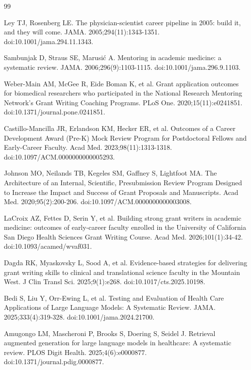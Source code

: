 \documentclass[11pt,a4paper]{article}
\begin{document}
\begin{thebibliography}{99}
\small

 Ley TJ, Rosenberg LE. The physician-scientist career pipeline in 2005: build it, and they will come. JAMA. 2005;294(11):1343-1351. doi:10.1001/jama.294.11.1343.

 Sambunjak D, Straus SE, Marusić A. Mentoring in academic medicine: a systematic review. JAMA. 2006;296(9):1103-1115. doi:10.1001/jama.296.9.1103.

 Weber-Main AM, McGee R, Eide Boman K, et al. Grant application outcomes for biomedical researchers who participated in the National Research Mentoring Network's Grant Writing Coaching Programs. PLoS One. 2020;15(11):e0241851. doi:10.1371/journal.pone.0241851.

 Castillo-Mancilla JR, Erlandson KM, Hecker ER, et al. Outcomes of a Career Development Award (Pre-K) Mock Review Program for Postdoctoral Fellows and Early-Career Faculty. Acad Med. 2023;98(11):1313-1318. doi:10.1097/ACM.0000000000005293.

 Johnson MO, Neilands TB, Kegeles SM, Gaffney S, Lightfoot MA. The Architecture of an Internal, Scientific, Presubmission Review Program Designed to Increase the Impact and Success of Grant Proposals and Manuscripts. Acad Med. 2020;95(2):200-206. doi:10.1097/ACM.0000000000003008.

 LaCroix AZ, Fettes D, Serin Y, et al. Building strong grant writers in academic medicine: outcomes of early-career faculty enrolled in the University of California San Diego Health Sciences Grant Writing Course. Acad Med. 2026;101(1):34-42. doi:10.1093/acamed/wvaf031.

 Dagda RK, Myaskovsky L, Sood A, et al. Evidence-based strategies for delivering grant writing skills to clinical and translational science faculty in the Mountain West. J Clin Transl Sci. 2025;9(1):e268. doi:10.1017/cts.2025.10198.

 Bedi S, Liu Y, Orr-Ewing L, et al. Testing and Evaluation of Health Care Applications of Large Language Models: A Systematic Review. JAMA. 2025;333(4):319-328. doi:10.1001/jama.2024.21700.

 Amugongo LM, Mascheroni P, Brooks S, Doering S, Seidel J. Retrieval augmented generation for large language models in healthcare: A systematic review. PLOS Digit Health. 2025;4(6):e0000877. doi:10.1371/journal.pdig.0000877.


\end{thebibliography}
\end{document}
